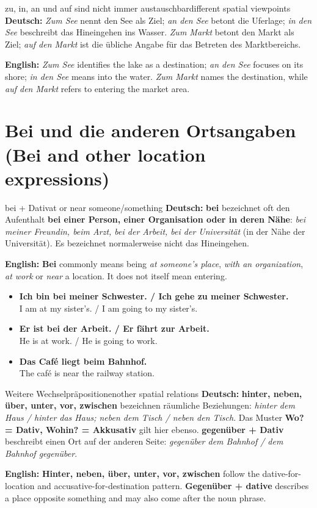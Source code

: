 \documentclass[a4paper,11pt]{article}
\newcommand{\GermanText}[1]{\textbf{Deutsch: }#1\par}
\newcommand{\EnglishText}[1]{{\small\color{SoftGray}\textbf{English: }#1\par}}
\newcommand{\ExampleItem}[2]{\item \textbf{#1}\\{\small\color{SoftGray}#2}}
\begin{document}
\begin{grammarentry}{zu, in, an und auf sind nicht immer austauschbar}{different spatial viewpoints}
\GermanText{\emph{Zum See} nennt den See als Ziel; \emph{an den See} betont die Uferlage; \emph{in den See} beschreibt das Hineingehen ins Wasser. \emph{Zum Markt} betont den Markt als Ziel; \emph{auf den Markt} ist die übliche Angabe für das Betreten des Marktbereichs.}
\EnglishText{\emph{Zum See} identifies the lake as a destination; \emph{an den See} focuses on its shore; \emph{in den See} means into the water. \emph{Zum Markt} names the destination, while \emph{auf den Markt} refers to entering the market area.}
\end{grammarentry}

\section{Bei und die anderen Ortsangaben (Bei and other location expressions)}
\begin{grammarentry}{bei + Dativ}{at or near someone/something}
\GermanText{\textbf{bei} bezeichnet oft den Aufenthalt \textbf{bei einer Person, einer Organisation oder in deren Nähe}: \emph{bei meiner Freundin, beim Arzt, bei der Arbeit, bei der Universität} (in der Nähe der Universität). Es bezeichnet normalerweise nicht das Hineingehen.}
\EnglishText{\textbf{Bei} commonly means being \emph{at someone's place}, \emph{with an organization}, \emph{at work} or \emph{near} a location. It does not itself mean entering.}
\end{grammarentry}
\begin{exbox}\begin{itemize}
\ExampleItem{Ich bin bei meiner Schwester. / Ich gehe zu meiner Schwester.}{I am at my sister's. / I am going to my sister's.}
\ExampleItem{Er ist bei der Arbeit. / Er fährt zur Arbeit.}{He is at work. / He is going to work.}
\ExampleItem{Das Café liegt beim Bahnhof.}{The café is near the railway station.}
\end{itemize}\end{exbox}
\begin{grammarentry}{Weitere Wechselpräpositionen}{other spatial relations}
\GermanText{\textbf{hinter, neben, über, unter, vor, zwischen} bezeichnen räumliche Beziehungen: \emph{hinter dem Haus / hinter das Haus; neben dem Tisch / neben den Tisch}. Das Muster \textbf{Wo? = Dativ, Wohin? = Akkusativ} gilt hier ebenso. \textbf{gegenüber + Dativ} beschreibt einen Ort auf der anderen Seite: \emph{gegenüber dem Bahnhof / dem Bahnhof gegenüber}.}
\EnglishText{\textbf{Hinter, neben, über, unter, vor, zwischen} follow the dative-for-location and accusative-for-destination pattern. \textbf{Gegenüber + dative} describes a place opposite something and may also come after the noun phrase.}
\end{grammarentry}
\end{document}
